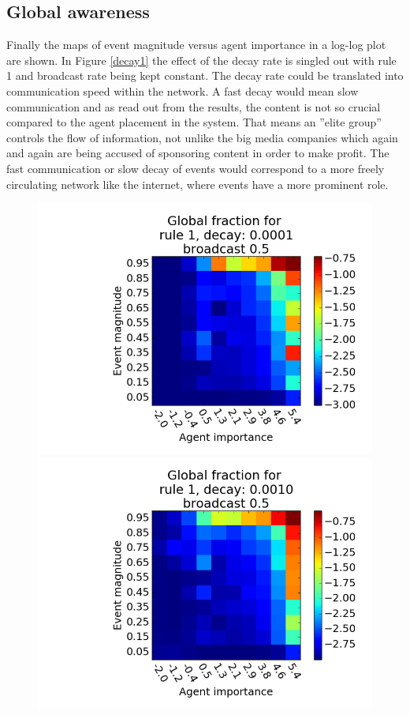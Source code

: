 \documentclass [12pt,a4paper,twoside]{article}
\begin{document}
\subsection{Global awareness}
Finally the maps of event magnitude versus agent importance in a log-log plot are shown. In Figure \ref{decay1} the effect of the decay rate is singled out with rule 1 and broadcast rate being kept constant. The decay rate could be translated into communication speed within the network. A fast decay would mean slow communication and as read out from the results, the content is not so crucial compared to the agent placement in the system. That means an ''elite group'' controls the flow of information, not unlike the big media companies which again and again are being accused of sponsoring content in order to make profit. The fast communication or slow decay of events would correspond to a more freely circulating network like the internet, where events have a more prominent role.

\begin{figure}[H]
  \centering
  \includegraphics[width=0.45\linewidth]{report/r1d0001b05.png}
  \includegraphics[width=0.45\linewidth]{report/r1d001b05.png}  
\end{figure}
\end{document}
